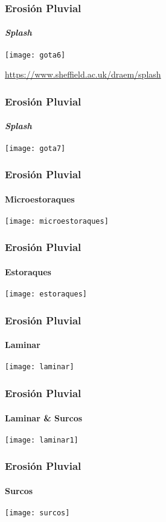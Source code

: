 \documentclass{beamer}
\begin{document}
\begin{frame}
\frametitle{Erosión Pluvial}
\framesubtitle{\it{Splash}}
\begin{center}
\texttt{[image: gota6]}
\end{center}
\tiny{\url{https://www.sheffield.ac.uk/draem/splash}}
\end{frame}
\begin{frame}
\frametitle{Erosión Pluvial}
\framesubtitle{\it{Splash}}
\begin{center}
\texttt{[image: gota7]}
\end{center}
\end{frame}
\begin{frame}
\frametitle{Erosión Pluvial}
\framesubtitle{Microestoraques}
\begin{center}
\texttt{[image: microestoraques]}
\end{center}
\end{frame}
\begin{frame}
\frametitle{Erosión Pluvial}
\framesubtitle{Estoraques}
\begin{center}
\texttt{[image: estoraques]}
\end{center}
\end{frame}
\begin{frame}
\frametitle{Erosión Pluvial}
\framesubtitle{Laminar}
\begin{center}
\texttt{[image: laminar]}
\end{center}
\end{frame}
\begin{frame}
\frametitle{Erosión Pluvial}
\framesubtitle{Laminar \& Surcos}
\begin{center}
\texttt{[image: laminar1]}
\end{center}
\end{frame}
\begin{frame}
\frametitle{Erosión Pluvial}
\framesubtitle{Surcos}
\begin{center}
\texttt{[image: surcos]}
\end{center}
\end{frame}
\end{document}
